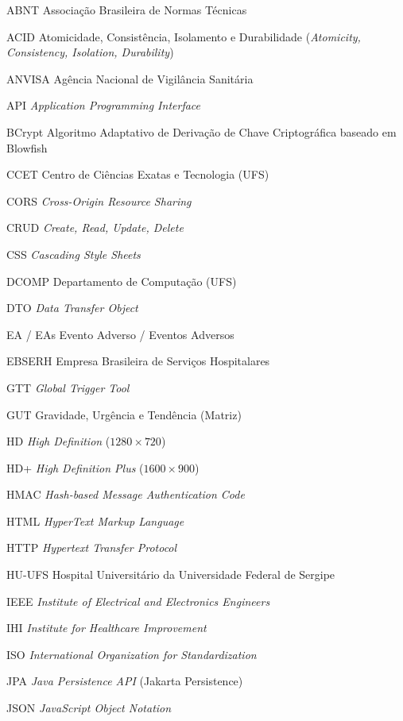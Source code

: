 \begin{siglas}
  \item[ABNT] Associação Brasileira de Normas Técnicas
  \item[ACID] Atomicidade, Consistência, Isolamento e Durabilidade (\textit{Atomicity, Consistency, Isolation, Durability})
  \item[ANVISA] Agência Nacional de Vigilância Sanitária
  \item[API] \textit{Application Programming Interface}
  \item[BCrypt] Algoritmo Adaptativo de Derivação de Chave Criptográfica baseado em Blowfish
  \item[CCET] Centro de Ciências Exatas e Tecnologia (UFS)
  \item[CORS] \textit{Cross-Origin Resource Sharing}
  \item[CRUD] \textit{Create, Read, Update, Delete}
  \item[CSS] \textit{Cascading Style Sheets}
  \item[DCOMP] Departamento de Computação (UFS)
  \item[DTO] \textit{Data Transfer Object}
  \item[EA / EAs] Evento Adverso / Eventos Adversos
  \item[EBSERH] Empresa Brasileira de Serviços Hospitalares
  \item[GTT] \textit{Global Trigger Tool}
  \item[GUT] Gravidade, Urgência e Tendência (Matriz)
  \item[HD] \textit{High Definition} ($1280 \times 720$)
  \item[HD+] \textit{High Definition Plus} ($1600 \times 900$)
  \item[HMAC] \textit{Hash-based Message Authentication Code}
  \item[HTML] \textit{HyperText Markup Language}
  \item[HTTP] \textit{Hypertext Transfer Protocol}
  \item[HU-UFS] Hospital Universitário da Universidade Federal de Sergipe
  \item[IEEE] \textit{Institute of Electrical and Electronics Engineers}
  \item[IHI] \textit{Institute for Healthcare Improvement}
  \item[ISO] \textit{International Organization for Standardization}
  \item[JPA] \textit{Java Persistence API} (Jakarta Persistence)
  \item[JSON] \textit{JavaScript Object Notation}

\end{siglas}
